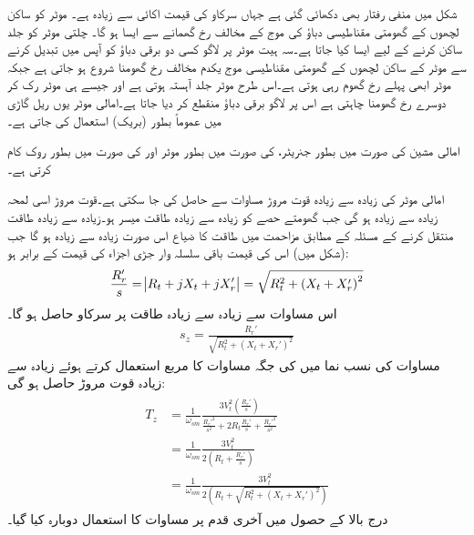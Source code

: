 شکل  میں منفی رفتار بھی دکھائی گئی ہے جہاں سرکاو کی قیمت اکائی سے زیادہ ہے۔ موٹر کو ساکن لچھوں کے گھومتی مقناطیسی دباؤ کی موج کے مخالف رخ گھمانے سے ایسا ہو گا۔ چلتی  موٹر کو جلد ساکن کرنے کے لیے ایسا کیا جاتا ہے۔سہ ہیت موٹر پر لاگو کسی دو برقی دباؤ کو آپس میں تبدیل کرنے سے موٹر کے ساکن لچھوں کے گھومتی مقناطیسی موج یکدم مخالف رخ گھومنا شروع ہو جاتی ہے جبکہ موٹر ابھی پہلے رخ گھوم رہی ہوتی ہے۔اس طرح موٹر جلد آہستہ ہوتی ہے اور جیسے ہی موٹر رک کر دوسرے رخ گھومنا چاہتی ہے اس پر لاگو برقی دباؤ منقطع کر دیا جاتا ہے۔امالی موٹر یوں ریل  گاڑی میں عموماً بطور  (بریک) استعمال کی جاتی ہے۔

امالی مشین  کی صورت میں بطور جنریٹر،  کی صورت میں بطور موٹر اور  کی صورت میں بطور روک کام کرتی ہے۔

امالی موٹر کی زیادہ سے زیادہ قوت مروڑ مساوات   سے  حاصل کی جا سکتی ہے۔قوت مروڑ اسی لمحہ زیادہ سے زیادہ ہو گی جب گھومتے حصے کو زیادہ سے زیادہ طاقت میسر ہو۔زیادہ سے زیادہ طاقت منتقل کرنے کے مسئلہ کے مطابق مزاحمت  میں طاقت کا ضیاع اس صورت زیادہ سے زیادہ ہو گا جب (شکل  میں) اس کی قیمت باقی سلسلہ وار جڑی  اجزاء کی قیمت کے برابر ہو:
\begin{align}\label{مساوات_امالی_زیادہ_طاقت_منتقلی_شرط}
\frac{R_r'}{s}=\abs{R_t+j X_t+j X_r'}=\sqrt{R_t^2+\left(X_t+X_r'\right)^2}
\end{align}
اس مساوات سے زیادہ سے زیادہ طاقت پر سرکاو  حاصل ہو گا۔
\begin{align}\label{مساوات_امالی_زیادہ_طاقت_پر_سرک}
s_z=\frac{R_r'}{\sqrt{R_t^2+\left(X_t+X_r'\right)^2}}
\end{align}
مساوات   کی نسب نما میں  کی جگہ  مساوات   کا مربع استعمال کرتے ہوئے زیادہ سے زیادہ قوت مروڑ  حاصل ہو گی:
\begin{gather}
\begin{aligned}\label{مساوات_امالی_زیادہ_سے_زیادہ_مروڑ}
T_z&=\frac{1}{\omega_{sm}} \frac{3 V_t^2 \left(\frac{R_r'}{s} \right)}{\frac{R_r'^2}{s^2}+2 R_t \frac{R_r'}{s}+\frac{R_r'^2}{s^2}}\\
&=\frac{1}{\omega_{sm}} \frac{3 V_t^2 }{2 \left(R_t+\frac{R_r'}{s} \right)}\\
&=\frac{1}{\omega_{sm}} \frac{3 V_t^2}{2 \left(R_t+\sqrt{R_t^2+\left(X_t+X_r' \right)^2} \right)}
\end{aligned}
\end{gather}
درج بالا کے حصول میں آخری قدم پر مساوات  کا استعمال دوبارہ کیا گیا۔

